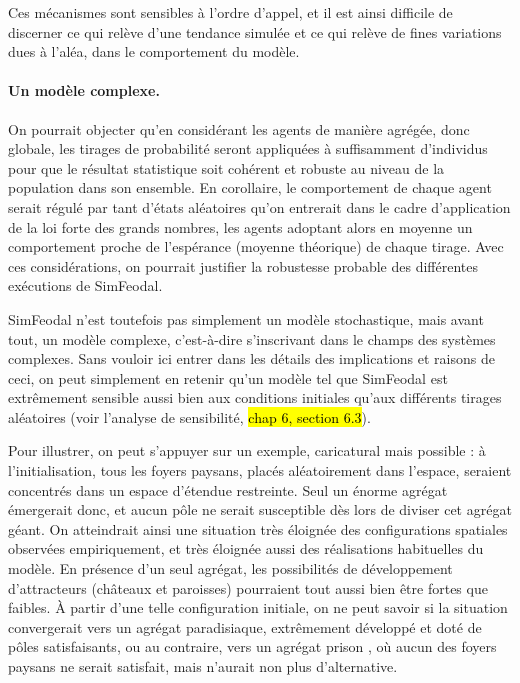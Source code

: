 Ces mécanismes sont sensibles à l'ordre d'appel, et il est ainsi difficile de discerner ce qui relève d'une tendance simulée et ce qui relève de fines variations dues à l'aléa, dans le comportement du modèle.

\paragraph{Un modèle complexe.}
On pourrait objecter qu'en considérant les agents de manière agrégée, donc globale, les tirages de probabilité seront appliquées à suffisamment d'individus pour que le résultat statistique soit cohérent et robuste au niveau de la population dans son ensemble.
En corollaire, le comportement de chaque agent serait régulé par tant d'états aléatoires qu'on entrerait dans le cadre d'application de la loi forte des grands nombres, les agents adoptant alors en moyenne un comportement proche de l'espérance (moyenne théorique) de chaque tirage.
Avec ces considérations, on pourrait justifier la robustesse probable des différentes exécutions de SimFeodal.

SimFeodal n'est toutefois pas simplement un modèle stochastique, mais avant tout, un modèle complexe, c'est-à-dire s'inscrivant dans le champs des systèmes complexes.
Sans vouloir ici entrer dans les détails des implications et raisons de ceci, on peut simplement en retenir qu'un modèle tel que SimFeodal est extrêmement sensible aussi bien aux conditions initiales qu'aux différents tirages aléatoires (voir l'analyse de sensibilité, \hl{chap 6, section 6.3}).

Pour illustrer, on peut s'appuyer sur un exemple, caricatural mais possible : à l'initialisation, tous les foyers paysans, placés aléatoirement dans l'espace, seraient concentrés dans un espace d'étendue restreinte.
Seul un énorme agrégat émergerait donc, et aucun pôle ne serait susceptible dès lors de diviser cet agrégat géant.
On atteindrait ainsi une situation très éloignée des configurations spatiales observées empiriquement, et très éloignée aussi des réalisations habituelles du modèle.
En présence d'un seul agrégat, les possibilités de développement d'attracteurs (châteaux et paroisses) pourraient tout aussi bien être fortes que faibles.
À partir d'une telle configuration initiale, on ne peut savoir si la situation convergerait vers un agrégat \og paradisiaque\fg{}, extrêmement développé et doté de pôles satisfaisants, ou au contraire, vers un agrégat \og prison \fg{}, où aucun des foyers paysans ne serait satisfait, mais n'aurait non plus d'alternative.

